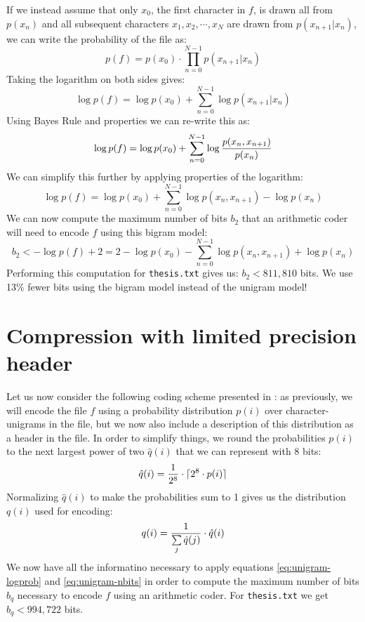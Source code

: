 \documentclass[10pt,a4paper,oneside,onecolumn]{article}
\DeclarePairedDelimiter{\ceil}{\lceil}{\rceil}
\newcommand*{\thesisTXT}{{\tt thesis.txt}\xspace}
\begin{document}
If we instead assume that only $x_0$, the first character in $f$, is drawn all
from $p(x_n)$ and all subsequent characters $x_1, x_2, \cdots, x_N$ are drawn
from $p(x_{n+1} | x_n)$, we can write the probability of the file as:
\begin{equation}
    p(f) = p(x_0) \cdot \prod\limits_{n = 0}^{N - 1} p(x_{n + 1} | x_n)
\end{equation}
Taking the logarithm on both sides gives:
\begin{equation}
    \log p(f) = \log p(x_0) + \sum\limits_{n = 0}^{N - 1} \log p(x_{n + 1} | x_n)
\end{equation}
Using Bayes Rule and properties we can re-write this as:
\begin{equation}
    \log p(f)
    = \log p(x_0) + \sum\limits_{n = 0}^{N - 1} \log {p(x_n, x_{n + 1}) \over p(x_n)}
\end{equation}
We can simplify this further by applying properties of the logarithm:
\begin{equation}
    \log p(f)
    = \log p(x_0) + \sum\limits_{n = 0}^{N - 1} \log p(x_n, x_{n + 1}) - \log p(x_n)
\end{equation}
We can now compute the maximum number of bits $b_2$ that an arithmetic coder
will need to encode $f$ using this bigram model:
\begin{equation}
    b_2 < -\log p(f) + 2
    = 2 - \log p(x_0) - \sum\limits_{n = 0}^{N - 1} \log p(x_n, x_{n + 1}) + \log p(x_n)
\end{equation}
Performing this computation for \thesisTXT gives us: $b_2 < 811,810$ bits. We
use 13\% fewer bits using the bigram model instead of the unigram model!


\section{Compression with limited precision header}\label{sec:ex4}

Let us now consider the following coding scheme presented in \cite{it-assign}:
as previously, we will encode the file $f$ using a probability distribution
$p(i)$ over character-unigrams in the file, but we now also include a
description of this distribution as a header in the file. In order to simplify
things, we round the probabilities $p(i)$ to the next largest power of two
${\hat q}(i)$ that we can represent with 8 bits:
\begin{equation}
    {\hat q}(i) = {1 \over 2^8} \cdot \ceil{2^8 \cdot p(i)}
\end{equation}
Normalizing ${\hat q}(i)$ to make the probabilities sum to 1 gives us the
distribution $q(i)$ used for encoding:
\begin{equation}
    q(i) = {1 \over \sum\limits_{j} {\hat q}(j)} \cdot {\hat q}(i)
\end{equation}
We now have all the informatino necessary to apply equations
\eqref{eq:unigram-logprob} and \eqref{eq:unigram-nbits} in order to compute the
maximum number of bits $b_q$ necessary to encode $f$ using an arithmetic coder.
For \thesisTXT we get $b_q < 994,722$ bits.
\end{document}
